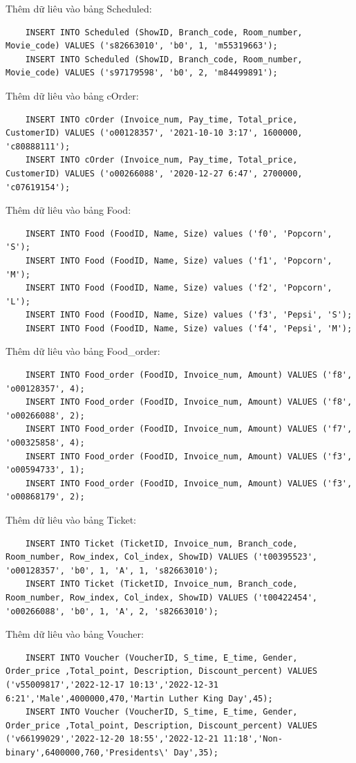 Thêm dữ liêu vào bảng Scheduled:
\begin{verbatim}
    INSERT INTO Scheduled (ShowID, Branch_code, Room_number, Movie_code) VALUES ('s82663010', 'b0', 1, 'm55319663');
    INSERT INTO Scheduled (ShowID, Branch_code, Room_number, Movie_code) VALUES ('s97179598', 'b0', 2, 'm84499891');
\end{verbatim}

Thêm dữ liêu vào bảng cOrder:
\begin{verbatim}
    INSERT INTO cOrder (Invoice_num, Pay_time, Total_price, CustomerID) VALUES ('o00128357', '2021-10-10 3:17', 1600000, 'c80888111');
    INSERT INTO cOrder (Invoice_num, Pay_time, Total_price, CustomerID) VALUES ('o00266088', '2020-12-27 6:47', 2700000, 'c07619154');
\end{verbatim}

Thêm dữ liêu vào bảng Food:
\begin{verbatim}
    INSERT INTO Food (FoodID, Name, Size) values ('f0', 'Popcorn', 'S');
    INSERT INTO Food (FoodID, Name, Size) values ('f1', 'Popcorn', 'M');
    INSERT INTO Food (FoodID, Name, Size) values ('f2', 'Popcorn', 'L');
    INSERT INTO Food (FoodID, Name, Size) values ('f3', 'Pepsi', 'S');
    INSERT INTO Food (FoodID, Name, Size) values ('f4', 'Pepsi', 'M');
\end{verbatim}

Thêm dữ liêu vào bảng Food\_order:
\begin{verbatim}
    INSERT INTO Food_order (FoodID, Invoice_num, Amount) VALUES ('f8', 'o00128357', 4);
    INSERT INTO Food_order (FoodID, Invoice_num, Amount) VALUES ('f8', 'o00266088', 2);
    INSERT INTO Food_order (FoodID, Invoice_num, Amount) VALUES ('f7', 'o00325858', 4);
    INSERT INTO Food_order (FoodID, Invoice_num, Amount) VALUES ('f3', 'o00594733', 1);
    INSERT INTO Food_order (FoodID, Invoice_num, Amount) VALUES ('f3', 'o00868179', 2);
\end{verbatim}

Thêm dữ liêu vào bảng Ticket:
\begin{verbatim}
    INSERT INTO Ticket (TicketID, Invoice_num, Branch_code, Room_number, Row_index, Col_index, ShowID) VALUES ('t00395523', 'o00128357', 'b0', 1, 'A', 1, 's82663010');
    INSERT INTO Ticket (TicketID, Invoice_num, Branch_code, Room_number, Row_index, Col_index, ShowID) VALUES ('t00422454', 'o00266088', 'b0', 1, 'A', 2, 's82663010');
\end{verbatim}

Thêm dữ liêu vào bảng Voucher:
\begin{verbatim}
    INSERT INTO Voucher (VoucherID, S_time, E_time, Gender, Order_price ,Total_point, Description, Discount_percent) VALUES ('v55009817','2022-12-17 10:13','2022-12-31 6:21','Male',4000000,470,'Martin Luther King Day',45);
    INSERT INTO Voucher (VoucherID, S_time, E_time, Gender, Order_price ,Total_point, Description, Discount_percent) VALUES ('v66199029','2022-12-20 18:55','2022-12-21 11:18','Non-binary',6400000,760,'Presidents\' Day',35);

\end{verbatim}

